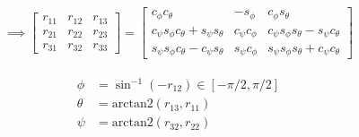 \documentclass{article}
\begin{document}
\begin{align}
  \implies \begin{bmatrix}
    r_{11} & r_{12} & r_{13}  \\
    r_{21} & r_{22} & r_{23}  \\
    r_{31} & r_{32} & r_{33}  
  \end{bmatrix}
  = \begin{bmatrix}
    c_\phi c_\theta & - s_\phi & c_\phi s_\theta \\
    c_\psi s_\phi c_\theta + s_\psi s_\theta &  c_\psi c_\phi & c_\psi s_\phi s_\theta  - s_\psi c_\theta \\
    s_\psi s_\phi c_\theta - c_\psi s_\theta & s_\psi c_\phi & s_\psi s_\phi s_\theta + c_\psi c_\theta
  \end{bmatrix}
\end{align}

\begin{align}
  \phi &= \sin^{-1}(-r_{12}) \in [-\pi/2, \pi/2]\\
  \theta &= \text{arctan2}(r_{13}, r_{11}) \\
  \psi &= \text{arctan2}(r_{32}, r_{22})
\end{align}
\newpage
\end{document}
